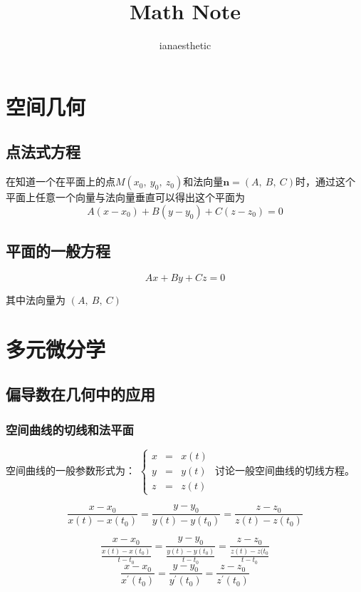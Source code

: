 \documentclass[10pt, a4paper]{article}
\title{Math Note}
\author{ianaesthetic}
\begin{document}
    \maketitle
    \newpage

    \section{空间几何}
        \subsection{点法式方程}
            在知道一个在平面上的点$M(x_0,\ y_0,\ z_0)$和法向量$\textbf{n} = (A,\ B,\ C)$时，通过这个平面上任意一个向量与法向量垂直可以得出这个平面为
            $$A(x - x_0) + B(y - y_0) + C(z - z_0) = 0$$
        \subsection{平面的一般方程}
            $$Ax + By + Cz = 0$$
            
            其中法向量为 $(A,\ B,\ C)$
    \section{多元微分学}
        \subsection{偏导数在几何中的应用}
            \subsubsection{空间曲线的切线和法平面}
                空间曲线的一般参数形式为：
                $
                    \left\{\begin{aligned}
                        x & = & x(t) \\
                        y & = & y(t) \\
                        z & = & z(t)
                    \end{aligned}
                    \right.
                $
                讨论一般空间曲线的切线方程。

                $$\frac{x - x_0}{x(t) - x(t_0)} = \frac{y - y_0}{y(t) - y(t_0)} = \frac{z - z_0}{z(t) - z(t_0)}$$
                
                $$\frac{x - x_0}{\frac{x(t) - x(t_0)}{t - t_0}} = \frac{y - y_0}{\frac{y(t) - y(t_0)}{t - t_0}} = \frac{z - z_0}{\frac{z(t) - z(t_0}{t - t_0}}$$
                \newline 
                \begin{equation}
                    \frac{x - x_0}{x^{'}(t_0)} = \frac{y - y_0}{y^{'}(t_0)} = \frac{z - z_0}{z^{'}(t_0)}
                \end{equation}
                
\end{document}
